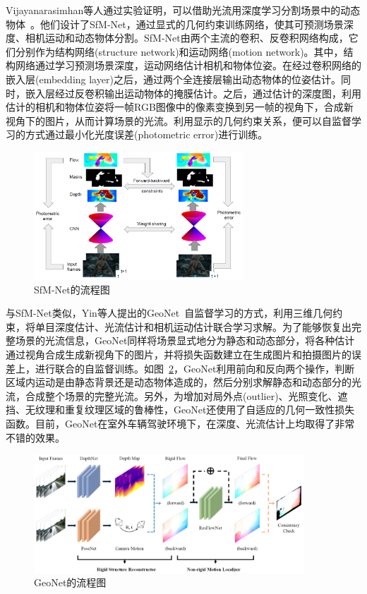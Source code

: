 Vijayanarasimhan等人通过实验证明，可以借助光流用深度学习分割场景中的动态物体~\cite{2017sfm}。他们设计了SfM-Net，通过显式的几何约束训练网络，使其可预测场景深度、相机运动和动态物体分割。SfM-Net由两个主流的卷积、反卷积网络构成，它们分别作为结构网络(structure network)和运动网络(motion network)。其中，结构网络通过学习预测场景深度，运动网络估计相机和物体位姿。在经过卷积网络的嵌入层(embedding layer)之后，通过两个全连接层输出动态物体的位姿估计。同时，嵌入层经过反卷积输出运动物体的掩膜估计。之后，通过估计的深度图，利用估计的相机和物体位姿将一帧RGB图像中的像素变换到另一帧的视角下，合成新视角下的图片，从而计算场景的光流。利用显示的几何约束关系，便可以自监督学习的方式通过最小化光度误差(photometric error)进行训练。

\begin{figure}[htbp]
	\centering
	\includegraphics[width=0.7\textwidth]{figs/1-2/sfm-net.png} 
	\caption{SfM-Net的流程图}
	\label{sfm-net}
\end{figure}


与SfM-Net类似，Yin等人提出的GeoNet~\cite{geonet}自监督学习的方式，利用三维几何约束，将单目深度估计、光流估计和相机运动估计联合学习求解。为了能够恢复出完整场景的光流信息，GeoNet同样将场景显式地分为静态和动态部分，将各种估计通过视角合成生成新视角下的图片，并将损失函数建立在生成图片和拍摄图片的误差上，进行联合的自监督训练。如图~\ref{fig:geonet}，GeoNet利用前向和反向两个操作，判断区域内运动是由静态背景还是动态物体造成的，然后分别求解静态和动态部分的光流，合成整个场景的完整光流。另外，为增加对局外点(outlier)、光照变化、遮挡、无纹理和重复纹理区域的鲁棒性，GeoNet还使用了自适应的几何一致性损失函数。目前，GeoNet在室外车辆驾驶环境下，在深度、光流估计上均取得了非常不错的效果。

\begin{figure}[htbp]
	\centering
	\includegraphics[width=0.9\textwidth]{figs/1-2/geonet.png} 
	\caption{GeoNet的流程图}
	\label{fig:geonet}
\end{figure}

